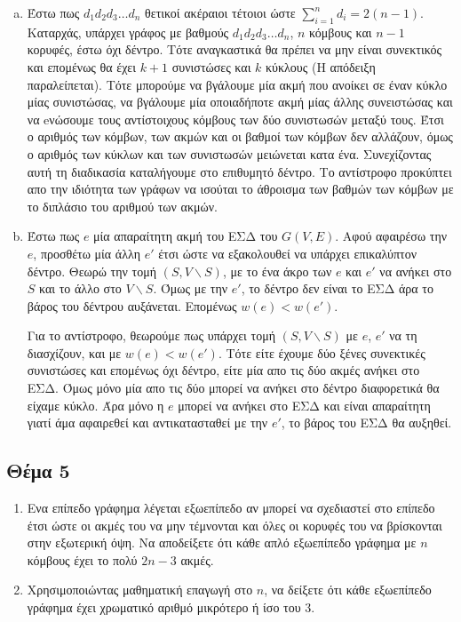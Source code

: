 \documentclass{assignment}
\begin{document}
\begin{enumerate}[(a)]

\item 
Έστω πως $d_1d_2d_3\dots d_n$ θετικοί ακέραιοι τέτοιοι ώστε $\sum_{i=1}^{n} d_i = 2(n-1)$. 
Καταρχάς, υπάρχει γράφος με βαθμούς $d_1d_2d_3\dots d_n$, $n$ κόμβους και $n-1$ κορυφές, έστω όχι δέντρο. 
Τότε αναγκαστικά θα πρέπει να μην είναι συνεκτικός και επομένως θα έχει $k+1$ συνιστώσες και $k$ κύκλους (Η απόδειξη παραλείπεται). 
Τότε μπορούμε να βγάλουμε μία ακμή που ανοίκει σε έναν κύκλο μίας συνιστώσας, να βγάλουμε μία οποιαδήποτε ακμή μίας άλλης 
συνειστώσας και να eνώσουμε τους αντίστοιχους κόμβους των δύο συνιστωσών μεταξύ τους. Έτσι ο αριθμός των κόμβων, 
των ακμών και οι βαθμοί των κόμβων δεν αλλάζουν, όμως ο αριθμός των κύκλων και των συνιστωσών μειώνεται κατα ένα. 
Συνεχίζοντας αυτή τη διαδικασία καταλήγουμε στο επιθυμητό δέντρο. Το αντίστροφο προκύπτει απο την ιδιότητα των γράφων
να ισούται το άθροισμα των βαθμών των κόμβων με το διπλάσιο του αριθμού των ακμών.
 
\item

Έστω πως $e$ μία απαραίτητη ακμή του ΕΣΔ του $G(V, E)$. Αφού αφαιρέσω την $e$, προσθέτω μία άλλη $e'$ έτσι ώστε να εξακολουθεί να 
υπάρχει επικαλύπτον δέντρο. Θεωρώ την τομή $(S, V \backslash S)$, με το ένα άκρο των $e$ και $e'$ να ανήκει στο $S$ και το 
άλλο στο $V \backslash S$. Όμως με την $e'$, το δέντρο δεν είναι το ΕΣΔ άρα το βάρος του δέντρου αυξάνεται. Επομένως $w(e) < w(e')$.

Για το αντίστροφο, θεωρούμε πως υπάρχει τομή $(S, V \backslash S)$ με $e$, $e'$ να τη διασχίζουν, και με $w(e) < w(e')$. Τότε είτε έχουμε 
δύο ξένες συνεκτικές συνιστώσες και επομένως όχι δέντρο, είτε μία απο τις δύο ακμές ανήκει στο ΕΣΔ. Όμως μόνο μία απο τις δύο μπορεί να ανήκει 
στο δέντρο διαφορετικά θα είχαμε κύκλο. Άρα μόνο η $e$ μπορεί να ανήκει στο ΕΣΔ και είναι απαραίτητη γιατί άμα αφαιρεθεί και αντικατασταθεί
με την $e'$, το βάρος του ΕΣΔ θα αυξηθεί.

\end{enumerate}

\newpage\subsection*{Θέμα 5}

\begin{enumerate}

\item
Ενα επίπεδο γράφημα λέγεται εξωεπίπεδο αν μπορεί να σχεδιαστεί στο επίπεδο έτσι ώστε οι ακμές του να μην τέμνονται 
και όλες οι κορυφές του να βρίσκονται στην εξωτερική όψη. Να αποδείξετε ότι κάθε απλό εξωεπίπεδο γράφημα με $n$ κόμβους έχει 
το πολύ $2n-3$ ακμές. 

\item
Χρησιμοποιώντας μαθηματική επαγωγή στο $n$, να δείξετε ότι κάθε εξωεπίπεδο γράφημα έχει χρωματικό αριθμό μικρότερο ή ίσο του 3.

\end{enumerate}
\end{document}
